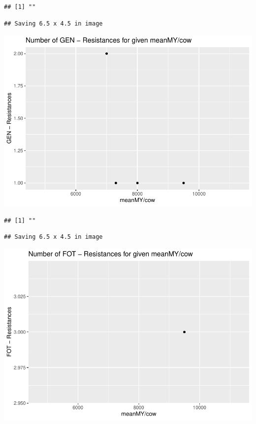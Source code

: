 \documentclass[
]{article}
\begin{document}
\begin{verbatim}
## [1] ""
\end{verbatim}

\begin{verbatim}
## Saving 6.5 x 4.5 in image
\end{verbatim}

\includegraphics{NResistenzen_files/figure-latex/numerical_variables-4.pdf}

\begin{verbatim}
## [1] ""
\end{verbatim}

\begin{verbatim}
## Saving 6.5 x 4.5 in image
\end{verbatim}

\includegraphics{NResistenzen_files/figure-latex/numerical_variables-5.pdf}
\end{document}
